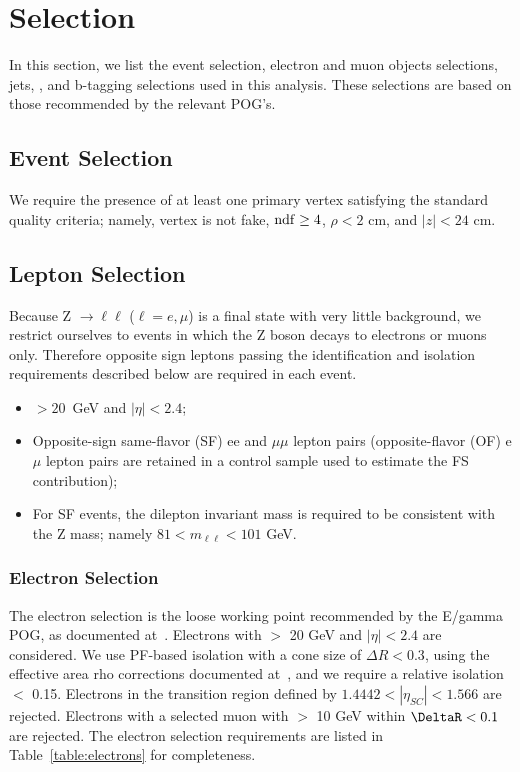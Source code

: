 \clearpage

\section{Selection}
\label{sec:eventSelection}

In this section, we list the event selection, electron and muon objects selections, jets, \MET, and b-tagging selections
used in this analysis. These selections are based on those recommended by the relevant POG's. 

\subsection{Event Selection}

We require the presence of at least one primary vertex satisfying the standard quality criteria; namely,
vertex is not fake, $\rm{ndf}\geq4$, $\rho<2$ cm, and $|z|<24$ cm.

\subsection{Lepton Selection}

Because Z $\rightarrow\ell\ell$ ($\ell=e,\mu$) is a final state with very little background,
we restrict ourselves to events in which the Z boson decays to electrons or muons only.
Therefore opposite sign leptons passing the identification and isolation requirements described below are required in each event.

\begin{itemize}
\item \pt $> 20$~GeV and $|\eta|<2.4$;
\item Opposite-sign same-flavor (SF) ee and $\mu\mu$ lepton pairs (opposite-flavor (OF) e$\mu$ lepton pairs are retained in a control 
  sample used to estimate the FS contribution);
\item For SF events, the dilepton invariant mass is required to be consistent with the Z mass; namely $81<m_{\ell\ell}<101$ GeV.
\end{itemize}

\subsubsection{Electron Selection}

The electron selection is the loose working point recommended by the E/gamma POG, as documented at~\cite{ref:Egamma}. 
Electrons with \pt $>$ 20 GeV and $|\eta|<2.4$ are considered.
We use PF-based isolation with a cone size of $\Delta R<0.3$, using the effective area rho corrections documented at~\cite{ref:Egammaiso},
and we require a relative isolation $<$ 0.15. 
Electrons in the transition region defined by $1.4442 < |\eta_{SC}| < 1.566$ are rejected.
Electrons with a selected muon with \pt $>$ 10 GeV within $\DeltaR<0.1$ are rejected.
The electron selection requirements are listed in Table~\ref{table:electrons} for completeness.

